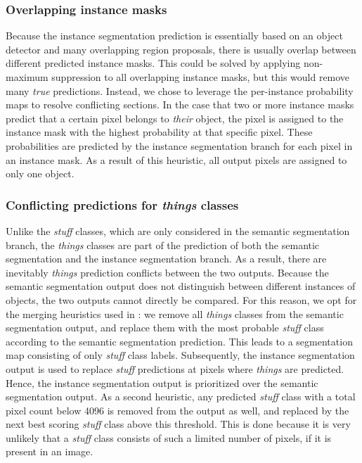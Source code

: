 \documentclass[10pt,twocolumn,letterpaper]{article}
\begin{document}
\subsubsection{Overlapping instance masks}
Because the instance segmentation prediction is essentially based on an object detector and many overlapping region proposals, there is usually overlap between different predicted instance masks. This could be solved by applying non-maximum suppression to all overlapping instance masks, but this would remove many \textit{true} predictions. Instead, we chose to leverage the per-instance probability maps to resolve conflicting sections. In the case that two or more instance masks predict that a certain pixel belongs to \textit{their} object, the pixel is assigned to the instance mask with the highest probability at that specific pixel. These probabilities are predicted by the instance segmentation branch for each pixel in an instance mask. As a result of this heuristic, all output pixels are assigned to only one object.


\subsubsection{Conflicting predictions for \textit{things} classes}
Unlike the \textit{stuff} classes, which are only considered in the semantic segmentation branch, the \textit{things} classes are part of the prediction of both the semantic segmentation and the instance segmentation branch. As a result, there are inevitably \textit{things} prediction conflicts between the two outputs. Because the semantic segmentation output does not distinguish between different instances of objects, the two outputs cannot directly be compared. For this reason, we opt for the merging heuristics used in \cite{Kirillov2018}: we remove all \textit{things} classes from the semantic segmentation output, and replace them with the most probable \textit{stuff} class according to the semantic segmentation prediction. This leads to a segmentation map consisting of only \textit{stuff} class labels. Subsequently, the instance segmentation output is used to replace \textit{stuff} predictions at pixels where \textit{things} are predicted. Hence, the instance segmentation output is prioritized over the semantic segmentation output. As a second heuristic, any predicted \textit{stuff} class with a total pixel count below 4096 is removed from the output as well, and replaced by the next best scoring \textit{stuff} class above this threshold. This is done because it is very unlikely that a \textit{stuff} class consists of such a limited number of pixels, if it is present in an image.
\end{document}
